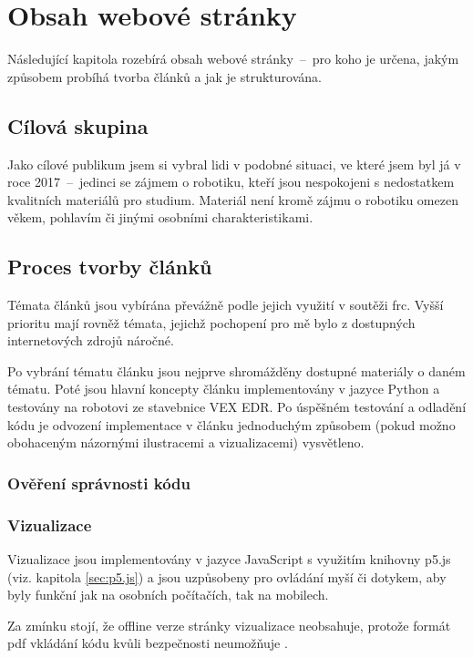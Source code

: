 \documentclass[a4paper, 12pt]{article}
\newcommand*{\fullref}[1]{\hyperref[{#1}]{\ref*{#1}}}
\begin{document}
  \section{Obsah webové stránky}
  Následující kapitola rozebírá obsah webové stránky~--~pro koho je určena, jakým způsobem probíhá tvorba článků a jak je strukturována.


  \subsection{Cílová skupina}
  Jako cílové publikum jsem si vybral lidi v podobné situaci, ve které jsem byl já v roce 2017~--~jedinci se zájmem o robotiku, kteří jsou nespokojeni s nedostatkem kvalitních materiálů pro studium. Materiál není kromě zájmu o robotiku omezen věkem, pohlavím či jinými osobními charakteristikami.


  \subsection{Proces tvorby článků} \label{sec:Tvorba článků}
  Témata článků jsou vybírána převážně podle jejich využití v soutěži \gls{frc}. Vyšší prioritu mají rovněž témata, jejichž pochopení pro mě bylo z dostupných internetových zdrojů náročné.

  Po vybrání tématu článku jsou nejprve shromážděny dostupné materiály o daném tématu. Poté jsou hlavní koncepty článku implementovány v jazyce Python a testovány na robotovi ze stavebnice VEX EDR. Po úspěšném testování a odladění kódu je odvození implementace v článku jednoduchým způsobem (pokud možno obohaceným názornými ilustracemi a vizualizacemi) vysvětleno.


  \subsubsection{Ověření správnosti kódu} \label{sec:Ověření správnosti kódu}


  \subsubsection{Vizualizace} \label{sec:Vizualizace}
  Vizualizace jsou implementovány v jazyce JavaScript s využitím knihovny p5.js (viz. kapitola \fullref{sec:p5.js}) a jsou uzpůsobeny pro ovládání myší či dotykem, aby byly funkční jak na osobních počítačích, tak na mobilech.

  Za zmínku stojí, že offline verze stránky vizualizace neobsahuje, protože formát \gls{pdf} vkládání kódu kvůli bezpečnosti neumožňuje \cite{history-of-pdf}.
\end{document}
